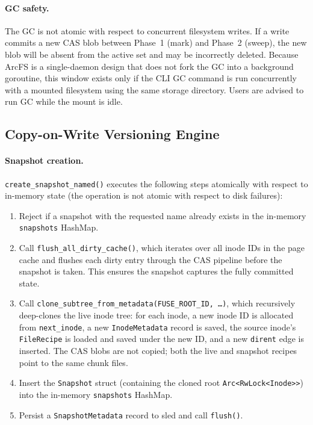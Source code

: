 \documentclass[5p,times]{elsarticle}
\begin{document}
\paragraph{GC safety.}
The GC is not atomic with respect to concurrent filesystem writes.
If a write commits a new CAS blob between Phase~1 (mark) and Phase~2
(sweep), the new blob will be absent from the active set and may be
incorrectly deleted.  Because ArcFS is a single-daemon design that
does not fork the GC into a background goroutine, this window exists
only if the CLI GC command is run concurrently with a mounted filesystem
using the same storage directory.  Users are advised to run GC while
the mount is idle.

\subsection{Copy-on-Write Versioning Engine}
\label{sec:cow}

\paragraph{Snapshot creation.}
\texttt{create\_snapshot\_named()} executes the following steps
atomically with respect to in-memory state (the operation is not atomic
with respect to disk failures):
\begin{enumerate}
\item Reject if a snapshot with the requested name already exists in
  the in-memory \texttt{snapshots} HashMap.
\item Call \texttt{flush\_all\_dirty\_cache()}, which iterates over
  all inode IDs in the page cache and flushes each dirty entry through
  the CAS pipeline before the snapshot is taken.  This ensures the
  snapshot captures the fully committed state.
\item Call \texttt{clone\_subtree\_from\_\allowbreak{}metadata(\allowbreak{}FUSE\_ROOT\_ID,\,\ldots)},
  which recursively deep-clones the live inode tree: for each inode,
  a new inode ID is allocated from \texttt{next\_inode}, a new
  \texttt{InodeMetadata} record is saved, the source inode's
  \texttt{FileRecipe} is loaded and saved under the new ID, and a new
  \texttt{dirent} edge is inserted.  The CAS blobs are not copied;
  both the live and snapshot recipes point to the same chunk files.
\item Insert the \texttt{Snapshot} struct (containing the cloned
  root \texttt{Arc\textless{}RwLock\textless{}Inode\textgreater{}\textgreater{}})
  into the in-memory \texttt{snapshots} HashMap.
\item Persist a \texttt{SnapshotMetadata} record to sled and call
  \texttt{flush()}.
\end{enumerate}
\end{document}
